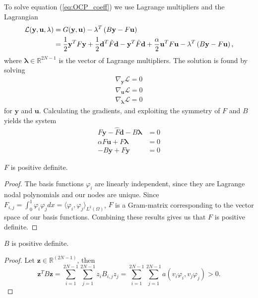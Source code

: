 To solve equation (\ref{eq:OCP_coeff}) we use Lagrange multipliers and the Lagrangian
\begin{equation} \label{eq:OCP_lagrangian}
\begin{split}
    \mathcal{L}(\mathbf{y, u, \lambda}) &= G(\mathbf{y, u}) - \mathbf{\lambda}^T \left( B\mathbf{y} - F\mathbf{u} \right) \\
    &= \frac{1}{2}\mathbf{y}^T F \mathbf{y} + \frac{1}{2}\mathbf{d}^T\Tilde{F} \mathbf{d} - \mathbf{y}^T\hat{F}\mathbf{d} + \frac{\alpha}{2}\mathbf{u}^T F \mathbf{u}  - \mathbf{\lambda}^T \left( B\mathbf{y} - F\mathbf{u} \right) ,
\end{split}
\end{equation}
where $\mathbf{\lambda} \in \mathds{R}^{2N-1}$ is the vector of Lagrange multipliers.
The solution is found by solving
\begin{align}
    \label{eq:gradients}
    \nabla_{\mathbf{y}}\mathcal{L} = 0 \\
    \nabla_{\mathbf{u}}\mathcal{L} = 0 \\
    \nabla_{\mathbf{\mathbf{\lambda}}}\mathcal{L} = 0
\end{align}
for $\mathbf{y}$ and $\mathbf{u}$.
Calculating the gradients, and exploiting the symmetry of \( F \) and \( B \)
yields the system
\begin{align}
  F \mathbf{y}- \hat{F}\mathbf{d} - B\mathbf{\lambda} &= 0 \\
  \alpha F \mathbf{u}+ F\mathbf{\lambda} &= 0 \\
  -B \mathbf{y} + F \mathbf{y} &= 0
\end{align}

\begin{lemma}
    $F$ is positive definite.    
\end{lemma}
\begin{proof}
    \label{lemma:F_invertible}
    The basis functions $\varphi_i$ are linearly independent, since they are Lagrange nodal polynomials and our nodes are unique.
    Since $F_{i,j} = \int_0^1 \varphi_i \varphi_j dx = \langle \varphi_i, \varphi_j \rangle_{L^2(\Omega)}$,
    $F$ is a Gram-matrix corresponding to the vector space of our basis functions.
    Combining these results gives us that $F$ is positive definite.
\end{proof}

\begin{lemma}
    \label{lemma:B_pos_def}
    $B$ is positive definite.
\end{lemma}
\begin{proof}
    Let $\mathbf{z} \in \mathds{R}^{(2N-1)}$, then 
    $$\mathbf{z}^T B \mathbf{z} = \sum_{i=1}^{2N-1}\sum_{j=1}^{2N-1} z_i B_{i,j}z_j =\sum_{i=1}^{2N-1}\sum_{j=1}^{2N-1}a(v_i \varphi_i, v_j\varphi_j) >0 .$$
\end{proof}

